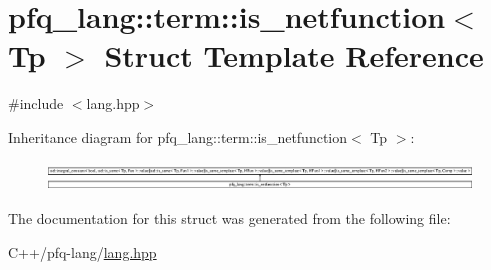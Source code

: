 \hypertarget{structpfq__lang_1_1term_1_1is__netfunction}{\section{pfq\-\_\-lang\-:\-:term\-:\-:is\-\_\-netfunction$<$ Tp $>$ Struct Template Reference}
\label{structpfq__lang_1_1term_1_1is__netfunction}
}


{\ttfamily \#include $<$lang.\-hpp$>$}

Inheritance diagram for pfq\-\_\-lang\-:\-:term\-:\-:is\-\_\-netfunction$<$ Tp $>$\-:\begin{figure}[H]
\begin{center}
\leavevmode
\includegraphics[height=0.775087cm]{structpfq__lang_1_1term_1_1is__netfunction}
\end{center}
\end{figure}


The documentation for this struct was generated from the following file\-:\begin{DoxyCompactItemize}
\item 
C++/pfq-\/lang/\hyperlink{lang_8hpp}{lang.\-hpp}\end{DoxyCompactItemize}
